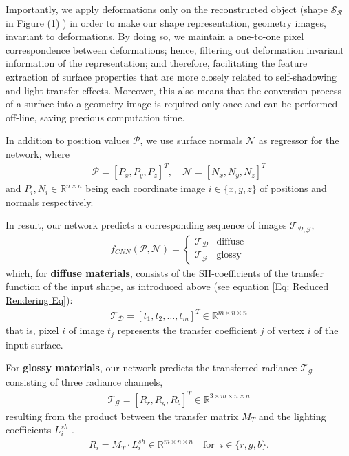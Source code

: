 Importantly, we apply deformations only on the reconstructed object (shape $\mathcal{S_R}$ in Figure (1) ) in order to make our shape representation, geometry images, invariant to deformations. By doing so, we maintain a one-to-one pixel correspondence between deformations; hence, filtering out deformation invariant information of the representation; and therefore, facilitating the feature extraction of surface properties that are more closely related to self-shadowing and light transfer effects. Moreover, this also means that the conversion process of a surface into a geometry image is required only once and can be performed off-line, saving precious computation time.

In addition to position values  $\mathcal{P}$, we use surface normals $\mathcal{N}$ as regressor for the network, where 
\begin{align*}
	\mathcal{P} = [ P_x, P_y, P_z ]^T , \quad
	\mathcal{N} = [ N_x, N_y, N_z ] ^T 
\end{align*}
and  $P_i, N_i \in \mathbb{R}^{n \times n }$ being each coordinate image  $i \in \{ x,y,z\}$ of positions and normals respectively. 

In result, our network predicts a corresponding sequence of images $\mathcal{T_{D,G}}$,
\begin{align*}
	f_{CNN} (  \mathcal{P} , \mathcal{N} ) = 
	\begin{cases}
	\mathcal{T_D}  & \text{diffuse} \\
	\mathcal{T_G} & \text{glossy}
	\end{cases}
\end{align*}
which, for \textbf{diffuse materials}, consists of the SH-coefficients of the transfer function of the input shape, as introduced above (see equation \ref{Eq: Reduced Rendering Eq}):
\begin{align*}
	\mathcal{T_D} = [ t_1, t_2, \dots, t_m ]^T \in \mathbb{R}^{m \times n \times n} 
\end{align*}
that is, pixel $i$ of image $t_j$ represents the transfer coefficient $j$ of vertex $i$ of the input surface.

For \textbf{glossy materials}, our network predicts the transferred radiance $\mathcal{T_G}$ consisting of three radiance channels, 
\begin{align*}
\mathcal{T_G} = [R_r , R_g ,R_b]^T \in \mathbb{R}^{3 \times m \times n \times n} 
\end{align*}
resulting from the product between the transfer matrix $M_T$ and the lighting coefficients  $ L^{sh}_i$ \cite{sloan2002precomputed}. 
\begin{align*}
R_i= M_T \cdot L^{sh}_i   \in \mathbb{R}^{m \times n \times n}   \quad \text{for }~  i \in \{r,g,b\} .
\end{align*}

